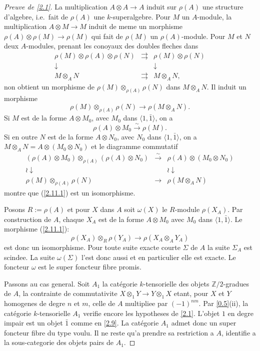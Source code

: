 \documentclass[11pt,a4paper]{article}
\theoremstyle{plain}
\theoremstyle{definition}
\begin{document}
\begin{proof}[Preuve de \ref{2.1}]
La multiplication $A\otimes A\to A$ induit sur $\rho(A)$ une structure d'algebre, i.e.~fait de $\rho(A)$ une $k$-superalgebre. Pour $M$ un $A$-module, la multiplication $A\otimes M\to M$ induit de meme un morphisme $\rho(A)\otimes\rho(M)\to\rho(M)$ qui fait de $\rho(M)$ un $\rho(A)$-module. Pour $M$ et $N$ deux $A$-modules, prenant les conoyaux des doubles fleches dans
\[
\begin{matrix}
\rho(M)\otimes\rho(A)\otimes\rho(N) & \rightrightarrows & \rho(M)\otimes\rho(N)\\
\downarrow & & \downarrow\\
M\otimes_A N & \rightrightarrows & M\otimes_A N,
\end{matrix}
\]
non obtient un morphisme de $\rho(M)\otimes_{\rho(A)}\rho(N)$ dans $M\otimes_A N$. Il induit un morphisme
\begin{equation}\label{2.11.1}
\rho(M)\otimes_{\rho(A)}\rho(N)\to\rho(M\otimes_A N).
\end{equation}
Si $M$ est de la forme $A\otimes M_0$, avec $M_0$ dans $\langle1,\bar{1}\rangle$, on a
\begin{equation}\label{2.11.2}
\rho(A)\otimes M_0\xrightarrow{\sim}\rho(M).
\end{equation}
Si en outre $N$ est de la forme $A\otimes N_0$, avec $N_0$ dans $\langle1,\bar{1}\rangle$, on a $M\otimes_A N=A\otimes(M_0\otimes N_0)$ et le diagramme commutatif
\[
\begin{matrix}
(\rho(A)\otimes M_0)\otimes_{\rho(A)}(\rho(A)\otimes N_0) & \xrightarrow{\sim} & \rho(A)\otimes(M_0\otimes N_0)\\
\wr\downarrow & & \wr\downarrow\\
\rho(M)\otimes_{\rho(A)}\rho(N) & \longrightarrow & \rho(M\otimes_A N)
\end{matrix}
\]
montre que (\ref{2.11.1}) est un isomorphisme.

Posons $R:=\rho(A)$ et pour $X$ dans $A$ soit $\omega(X)$ le $R$-module $\rho(X_A)$. Par construction de $A$, chaque $X_A$ est de la forme $A\otimes M_0$ avec $M_0$ dans $\langle1,\bar{1}\rangle$. Le morphisme (\ref{2.11.1}):
\[
\rho(X_A)\otimes_R\rho(Y_A)\to\rho(X_A\otimes_A Y_A)
\]
est donc un isomorphisme. Pour toute suite exacte courte $\Sigma$ de $A$ la suite $\Sigma_A$ est scindee. La suite $\omega(\Sigma)$ l'est donc aussi et en particulier elle est exacte. Le foncteur $\omega$ est le super foncteur fibre promis.

Passons au cas general. Soit $A_1$ la cat\'egorie $k$-tensorielle des objets $\mathbb{Z}/2$-gradues de $A$, la contrainte de commutativite $X\otimes_1Y\to Y\otimes_1X$ etant, pour $X$ et $Y$ homogenes de degre $n$ et $m$, celle de $A$ multipliee par $(-1)^{nm}$. Par \ref{0.5}(ii), la cat\'egorie $k$-tensorielle $A_1$ verifie encore les hypotheses de \ref{2.1}. L'objet $1$ en degre impair est un objet $\bar{1}$ comme en \ref{2.9}. La cat\'egorie $A_1$ admet donc un super foncteur fibre du type voulu. Il ne reste qu'a prendre sa restriction a $A$, identifie a la sous-categorie des objets pairs de $A_1$.
\end{proof}
\end{document}
